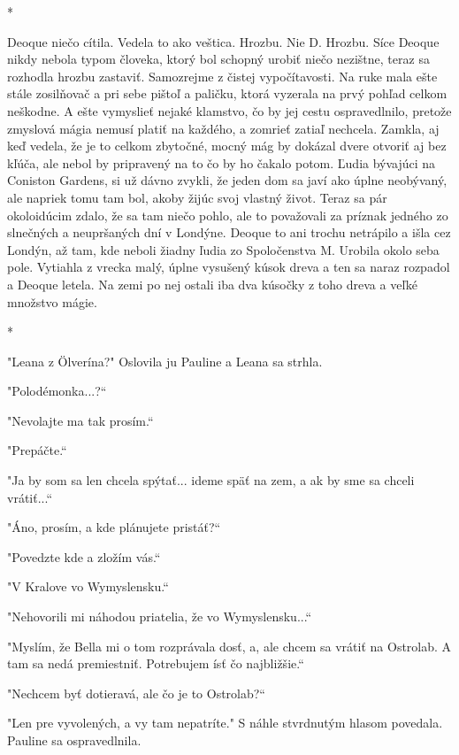 \documentclass{book}
\begin{document}
\begin{center}
*
\end{center}

Deoque niečo cítila. Vedela to ako veštica. Hrozbu. Nie D. Hrozbu. Síce Deoque nikdy nebola typom človeka, ktorý bol schopný urobiť niečo nezištne, teraz sa rozhodla hrozbu zastaviť. Samozrejme z čistej vypočítavosti. Na ruke mala ešte stále zosilňovač a pri sebe pištoľ a paličku, ktorá vyzerala na prvý pohľad celkom neškodne. A ešte vymyslieť nejaké klamstvo, čo by jej cestu ospravedlnilo, pretože zmyslová mágia nemusí platiť na každého, a zomrieť zatiaľ nechcela. Zamkla, aj keď vedela, že je to celkom zbytočné, mocný mág by dokázal dvere otvoriť aj bez kľúča, ale nebol by pripravený na to čo by ho čakalo potom. Ľudia bývajúci na Coniston Gardens, si už dávno zvykli, že jeden dom sa javí ako úplne neobývaný, ale napriek tomu tam bol, akoby žijúc svoj vlastný život. Teraz sa pár okoloidúcim zdalo, že sa tam niečo pohlo, ale to považovali za príznak jedného zo slnečných a neupršaných dní v Londýne. Deoque to ani trochu netrápilo a išla cez Londýn, až tam, kde neboli žiadny ľudia zo Spoločenstva M. Urobila okolo seba pole. Vytiahla z vrecka malý, úplne vysušený kúsok dreva a ten sa naraz rozpadol a Deoque letela. Na zemi po nej ostali iba dva kúsočky z toho dreva a veľké množstvo mágie.

\begin{center}
*
\end{center}

"$ $Leana z Ölverína?"$ $ Oslovila ju Pauline a Leana sa strhla.

"$ $Polodémonka...?“

"$ $Nevolajte ma tak prosím.“

"$ $Prepáčte.“

"$ $Ja by som sa len chcela spýtať... ideme späť na zem, a ak by sme sa chceli vrátiť...“

"$ $Áno, prosím, a kde plánujete pristáť?“

"$ $Povedzte kde a zložím vás.“

"$ $V Kralove vo Wymyslensku.“

"$ $Nehovorili mi náhodou priatelia, že vo Wymyslensku...“

"$ $Myslím, že Bella mi o tom rozprávala dosť, a, ale chcem sa vrátiť na Ostrolab. A tam sa nedá premiestniť. Potrebujem ísť čo najbližšie.“

"$ $Nechcem byť dotieravá, ale čo je to Ostrolab?“

"$ $Len pre vyvolených, a vy tam nepatríte."$ $ S náhle stvrdnutým hlasom povedala. Pauline sa ospravedlnila.
\end{document}
